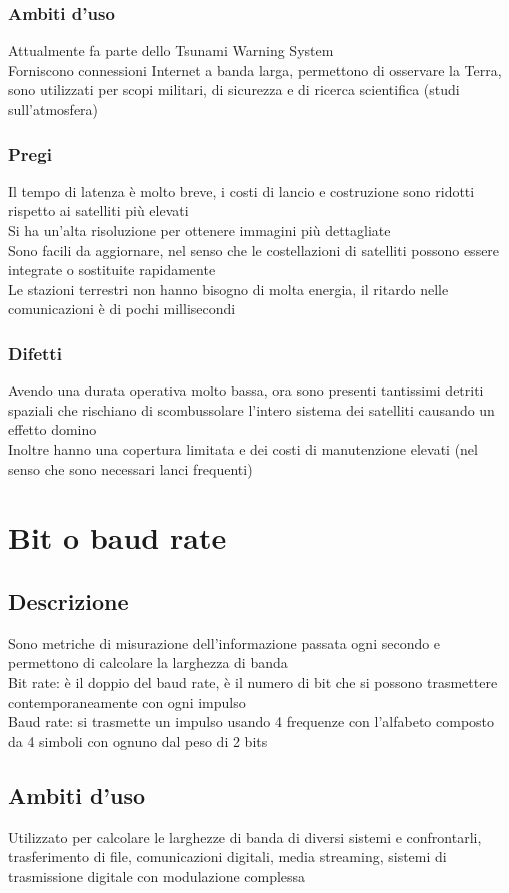 \documentclass[10pt,oneside,a4paper]{article}
\begin{document}
\subsubsection{Ambiti d'uso}
Attualmente fa parte dello Tsunami Warning System\\
Forniscono connessioni Internet a banda larga, permettono di osservare la Terra, sono utilizzati per scopi militari, di sicurezza e di ricerca scientifica (studi sull'atmosfera)
\subsubsection{Pregi}
Il tempo di latenza è molto breve, i costi di lancio e costruzione sono ridotti rispetto ai satelliti più elevati\\
Si ha un'alta risoluzione per ottenere immagini più dettagliate\\
Sono facili da aggiornare, nel senso che le costellazioni di satelliti possono essere integrate o sostituite rapidamente\\
Le stazioni terrestri non hanno bisogno di molta energia, il ritardo nelle comunicazioni è di pochi millisecondi
\subsubsection{Difetti}
Avendo una durata operativa molto bassa, ora sono presenti tantissimi detriti spaziali che rischiano di scombussolare l'intero sistema dei satelliti causando un effetto domino\\
Inoltre hanno una copertura limitata e dei costi di manutenzione elevati (nel senso che sono necessari lanci frequenti)
\section{Bit o baud rate}
\subsection{Descrizione}
Sono metriche di misurazione dell'informazione passata ogni secondo e permettono di calcolare la larghezza di banda\\
Bit rate: è il doppio del baud rate, è il numero di bit che si possono trasmettere contemporaneamente con ogni impulso\\
Baud rate: si trasmette un impulso usando 4 frequenze con l'alfabeto composto da 4 simboli con ognuno dal peso di 2 bits
\subsection{Ambiti d'uso}
Utilizzato per calcolare le larghezze di banda di diversi sistemi e confrontarli, trasferimento di file, comunicazioni digitali, media streaming, sistemi di trasmissione digitale con modulazione complessa
\end{document}
